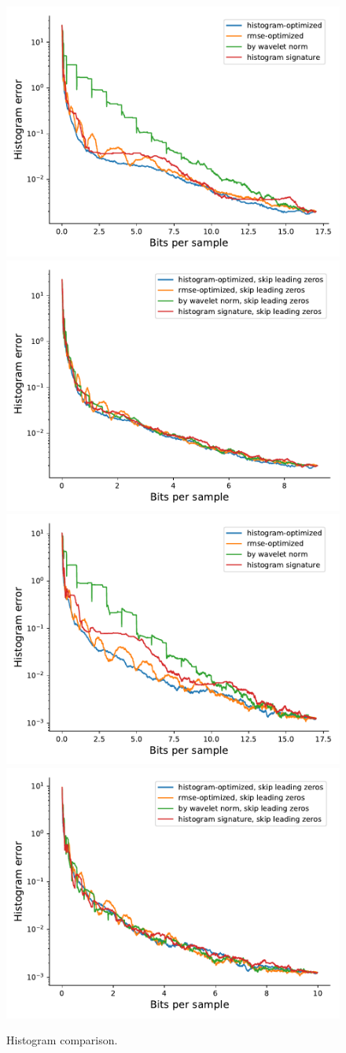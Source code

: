 \begin{figure}
	{\includegraphics[width=0.48\linewidth]{img/histogram/miranda-diffusivity-histogram.pdf}}
	{\includegraphics[width=0.48\linewidth]{img/histogram/skip-leading-zeros/miranda-diffusivity-histogram.pdf}}
	{\includegraphics[width=0.48\linewidth]{img/histogram/turbulence-histogram.pdf}}
	{\includegraphics[width=0.48\linewidth]{img/histogram/skip-leading-zeros/turbulence-histogram.pdf}}
	\caption{Histogram comparison.}
	\label{fig:histogram-comparison}
\end{figure}

